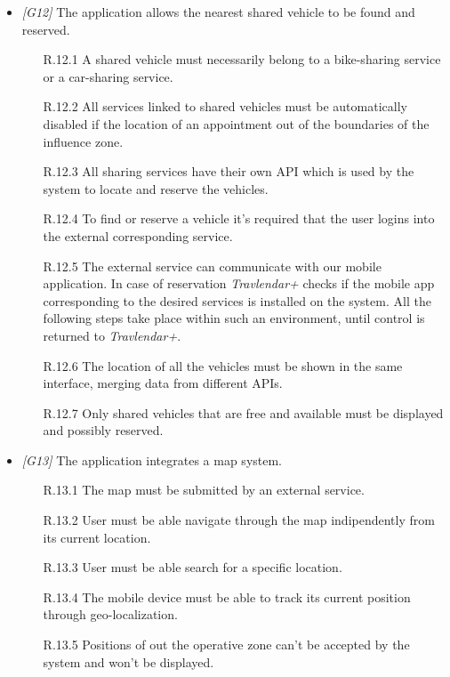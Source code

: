 \begin{itemize}
	\item \textit{[G12]} The application allows the nearest shared vehicle to be found and reserved.
		\begin{itemize}
			\item [R.12.1] A shared vehicle must necessarily belong to a bike-sharing service or a car-sharing service.
			\item [R.12.2] All services linked to shared vehicles must be automatically disabled if the location of an appointment out of the boundaries of the influence zone.
			\item [R.12.3] All sharing services have their own API which is used by the system to locate and reserve the vehicles.
			\item [R.12.4] To find or reserve a vehicle it's required that the user logins into the external corresponding service.
			\item [R.12.5] The external service can communicate with our mobile application. In case of reservation \textit{Travlendar+} checks if the mobile app corresponding to the desired services is installed on the system. All the following steps take place within such an environment, until control is returned to \textit{Travlendar+}.
			\item [R.12.6] The location of all the vehicles must be shown in the same interface, merging data from different APIs.
			\item[R.12.7] Only shared vehicles that are free and available must be displayed and possibly reserved.
		\end{itemize}


	\item \textit{[G13]} The application integrates a map system.
		\begin{itemize}
			\item [R.13.1] The map must be submitted by an external service.
			\item [R.13.2] User must be able navigate through the map indipendently from its current location.
			\item [R.13.3] User must be able search for a specific location.
			\item [R.13.4] The mobile device must be able to track its current position through geo-localization.
			\item [R.13.5] Positions of out the operative zone can't be accepted by the system and won't be displayed.
		\end{itemize}



\end{itemize}
